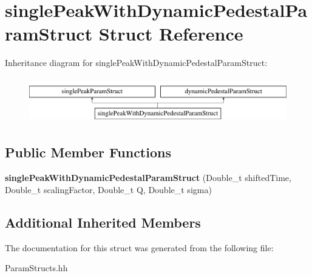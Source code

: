 \hypertarget{structsingle_peak_with_dynamic_pedestal_param_struct}{}\section{single\+Peak\+With\+Dynamic\+Pedestal\+Param\+Struct Struct Reference}
\label{structsingle_peak_with_dynamic_pedestal_param_struct}
Inheritance diagram for single\+Peak\+With\+Dynamic\+Pedestal\+Param\+Struct\+:\begin{figure}[H]
\begin{center}
\leavevmode
\includegraphics[height=2.000000cm]{structsingle_peak_with_dynamic_pedestal_param_struct}
\end{center}
\end{figure}
\subsection*{Public Member Functions}
\begin{DoxyCompactItemize}
\item 
\hypertarget{structsingle_peak_with_dynamic_pedestal_param_struct_a8626ce58ea8b85e97cfc8d6a94ec4b92}{}{\bfseries single\+Peak\+With\+Dynamic\+Pedestal\+Param\+Struct} (Double\+\_\+t shifted\+Time, Double\+\_\+t scaling\+Factor, Double\+\_\+t Q, Double\+\_\+t sigma)\label{structsingle_peak_with_dynamic_pedestal_param_struct_a8626ce58ea8b85e97cfc8d6a94ec4b92}

\end{DoxyCompactItemize}
\subsection*{Additional Inherited Members}


The documentation for this struct was generated from the following file\+:\begin{DoxyCompactItemize}
\item 
Param\+Structs.\+hh\end{DoxyCompactItemize}
